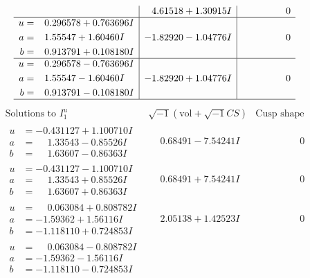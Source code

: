\documentclass[1p]{elsarticle_modified}
\theoremstyle{definition}
\newcommand{\I}{\sqrt{-1}}
\begin{document}
$$\begin{array}{c|c|c}
 & \phantom{-}4.61518 + 1.30915 I & \phantom{-0.000000 } 0 \\ \hline\begin{aligned}
u &= \phantom{-}0.296578 + 0.763696 I \\
a &= \phantom{-}1.55547 + 1.60460 I \\
b &= \phantom{-}0.913791 + 0.108180 I\end{aligned}
 & -1.82920 - 1.04776 I & \phantom{-0.000000 } 0 \\ \hline\begin{aligned}
u &= \phantom{-}0.296578 - 0.763696 I \\
a &= \phantom{-}1.55547 - 1.60460 I \\
b &= \phantom{-}0.913791 - 0.108180 I\end{aligned}
 & -1.82920 + 1.04776 I & \phantom{-0.000000 } 0\\
 \hline 
 \end{array}$$\newpage$$\begin{array}{c|c|c}  
\text{Solutions to }I^u_{1}& \I (\text{vol} + \sqrt{-1}CS) & \text{Cusp shape}\\
 \hline 
\begin{aligned}
u &= -0.431127 + 1.100710 I \\
a &= \phantom{-}1.33543 - 0.85526 I \\
b &= \phantom{-}1.63607 - 0.86363 I\end{aligned}
 & \phantom{-}0.68491 - 7.54241 I & \phantom{-0.000000 } 0 \\ \hline\begin{aligned}
u &= -0.431127 - 1.100710 I \\
a &= \phantom{-}1.33543 + 0.85526 I \\
b &= \phantom{-}1.63607 + 0.86363 I\end{aligned}
 & \phantom{-}0.68491 + 7.54241 I & \phantom{-0.000000 } 0 \\ \hline\begin{aligned}
u &= \phantom{-}0.063084 + 0.808782 I \\
a &= -1.59362 + 1.56116 I \\
b &= -1.118110 + 0.724853 I\end{aligned}
 & \phantom{-}2.05138 + 1.42523 I & \phantom{-0.000000 } 0 \\ \hline\begin{aligned}
u &= \phantom{-}0.063084 - 0.808782 I \\
a &= -1.59362 - 1.56116 I \\
b &= -1.118110 - 0.724853 I\end{aligned}

\end{array}$$
\end{document}
